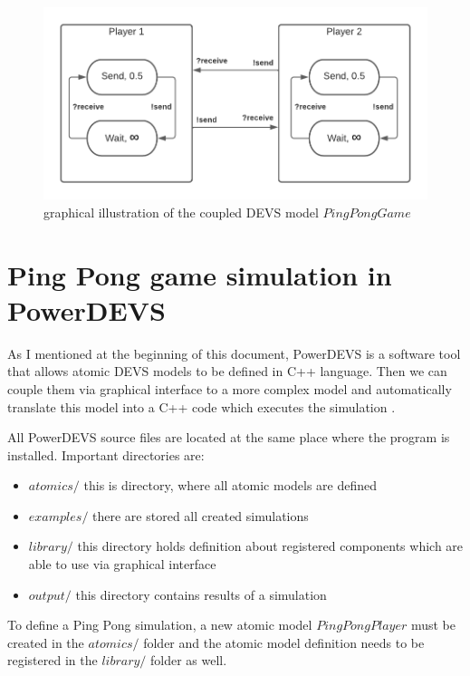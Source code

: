 \documentclass[fleqn,10pt]{olplainarticle}
\begin{document}
\begin{figure}[ht]
\centering
\includegraphics[width=1.0\linewidth]{images/2-CoupledDEVS - Ping Pong.png}
\caption{graphical illustration of the coupled DEVS model $PingPongGame$}
\label{fig:figure2}
\end{figure}

\section{Ping Pong game simulation in PowerDEVS}

As I mentioned at the beginning of this document, PowerDEVS is a software tool that allows atomic DEVS models to be defined in C++ language. Then we can couple them via graphical interface to a more complex model and automatically translate this model into a C++ code which executes the simulation \cite{PowerDEVS}.

\vskip10pt

All PowerDEVS source files are located at the same place where the program is installed. Important directories are:

\begin{itemize}
    \item $atomics/$ this is directory, where all atomic models are defined
    \item $examples/$ there are stored all created simulations
    \item $library/$ this directory holds definition about registered components which are able to use via graphical interface
    \item $output/$ this directory contains results of a simulation
\end{itemize}

\vskip10pt

\noindent To define a Ping Pong simulation, a new atomic model $PingPongPlayer$ must be created in the $atomics/$ folder and the atomic model definition needs to be registered in the $library/$ folder as well.
\end{document}
